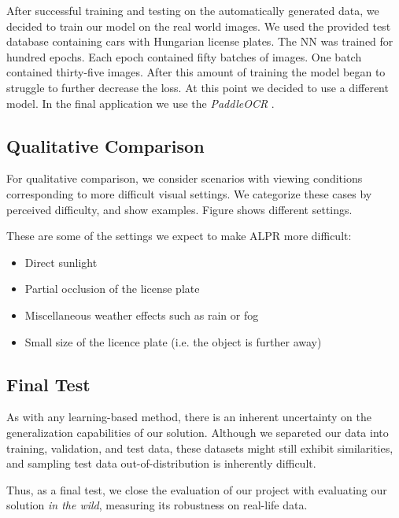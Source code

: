 After successful training and testing on the automatically generated data,
we decided to train our model on the real world images.
We used the provided test database containing cars with Hungarian license plates.
The \ac{NN} was trained for hundred epochs.
Each epoch contained fifty batches of images.
One batch contained thirty-five images.
After this amount of training the model began to struggle to further decrease the loss.
At this point we decided to use a different model.
In the final application we use the \emph{PaddleOCR} \cite{DBLP:journals/corr/abs-2009-09941}.






\subsection{Qualitative Comparison}
For qualitative comparison, we consider scenarios with viewing conditions
corresponding to more difficult visual settings. We categorize these cases by
perceived difficulty, and show examples. Figure  shows
different settings. 

These are some of the settings we expect to make \ac{ALPR} more
difficult:
\begin{itemize}
    \item Direct sunlight 
    \item Partial occlusion of the license plate 
    \item Miscellaneous weather effects such as rain or fog
    \item Small size of the licence plate (i.e. the object is further away)
\end{itemize}

\subsection{Final Test}
As with any learning-based method, there is an inherent uncertainty on the
generalization capabilities of our solution. Although we separeted our data into
training, validation, and test data, these datasets might still exhibit
similarities, and sampling test data out-of-distribution is inherently
difficult.

Thus, as a final test, we close the evaluation of our project with evaluating
our solution \textit{in the wild}, measuring its robustness on real-life data.

